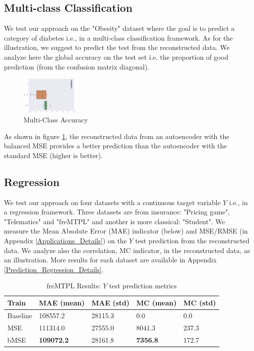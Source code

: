 \documentclass{article}
\theoremstyle{definition}
\begin{document}
\subsection{Multi-class Classification}
We test our approach on the "Obesity" dataset where the goal is to predict a category of diabetes i.e., in a multi-class classification framework.   
As for the illustration, we suggest to predict the test from the reconstructed data. We analyze here the global accuracy on the test set i.e. the proportion of good prediction (from the confusion matrix diagonal).

\begin{figure}[ht]
     \centering
         \includegraphics[width=0.25\textwidth]{imgs/Obesity/Boxplot_ACC.png}
         \caption{Multi-Class Accuracy}
         \label{Boxplot_ACC}
\end{figure}

As shown in figure \ref{Boxplot_ACC}, the reconstructed data from an autoencoder with the balanced MSE provides a better prediction than the autoencoder with the standard MSE (higher is better).



\subsection{Regression}
We test our approach on four datasets with a continuous target variable $Y$ i.e., in a regression framework. Three datasets are from insurance:  "Pricing game", "Telematics" and "freMTPL" and another is more classical: "Student". We measure the Mean Absolute Error (MAE) indicator (below) and MSE/RMSE (in Appendix \ref{Applications_Details}) on the $Y$ test prediction from the reconstructed data. We analyze also the correlation, MC indicator, in the reconstructed data, as an illustration. More results for each dataset are available in Appendix \ref{Prediction_Regression_Details}.

\begin{table}[h!]
\centering
\begin{tabular}{|p{1.5cm}||p{1cm}|p{1cm}||p{1cm}|p{1cm}|} 
\hline
Train & MAE (mean) & MAE (std) & MC (mean) & MC (std)\\ [0.5ex] 
\hline\hline
Baseline & 108557.2 & 28115.3&  0.0 & 0.0  \\ 
\hline
MSE & 111314.0 & 27555.0  & 8041.3 & 237.3  \\
\hline
bMSE &  \textbf{109072.2} & 28161.8  & \textbf{7356.8} & 172.7  \\
\hline
\end{tabular}
\caption{freMTPL Results: $Y$ test prediction metrics}
     \label{Prediction_freMTPL1}
\end{table}
\end{document}
